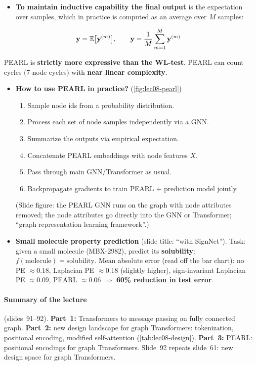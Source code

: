 \begin{itemize}
  \item \textbf{To maintain inductive capability the final output} is the
    expectation over samples, which in practice is computed as an average over
    $M$ samples:
\end{itemize}
\begin{equation}\label{eq:lec08-pearl}
  \mathbf{y} = \mathbb{E}\big[\mathbf{y}^{(m)}\big],\qquad
  \mathbf{y} = \frac{1}{M}\sum_{m=1}^{M}\mathbf{y}^{(m)}
\end{equation}
\begin{proposition}\label{prop:lec08-pearl}
  PEARL is \textbf{strictly more expressive than the WL-test}. PEARL can count
  cycles (7-node cycles) with \textbf{near linear complexity}.
\end{proposition}
\begin{itemize}
  \item \textbf{How to use PEARL in practice?} (\cref{fig:lec08-pearl})
    \begin{enumerate}[label=\arabic*.]
      \item Sample node ids from a probability distribution.
      \item Process each set of node samples independently via a GNN.
      \item Summarize the outputs via empirical expectation.
      \item Concatenate PEARL embeddings with node features $X$.
      \item Pass through main GNN/Transformer as usual.
      \item Backpropagate gradients to train PEARL + prediction model jointly.
    \end{enumerate}
    (Slide figure: the PEARL GNN runs on the graph with node attributes removed;
    the node attributes go directly into the GNN or Transformer;
    ``graph representation learning framework''.)
  \item \textbf{Small molecule property prediction} (slide title: ``with
    SignNet''). Task: given a small molecule (MBX-2982), predict its
    \textbf{solubility}: $f(\text{molecule}) = \text{solubility}$. Mean absolute
    error (read off the bar chart): no PE $\approx0.18$, Laplacian PE
    $\approx0.18$ (slightly higher), sign-invariant Laplacian PE $\approx0.09$,
    PEARL $\approx0.06$ $\Rightarrow$ \textbf{60\% reduction in test error}.
\end{itemize}

\paragraph{Summary of the lecture} (slides~91--92).
\textbf{Part~1:} Transformers to message passing on fully connected graph.
\textbf{Part~2:} new design landscape for graph Transformers: tokenization,
positional encoding, modified self-attention (\cref{tab:lec08-design}).
\textbf{Part~3:} PEARL: positional encodings for graph Transformers. Slide~92
repeats slide~61: new design space for graph Transformers.

